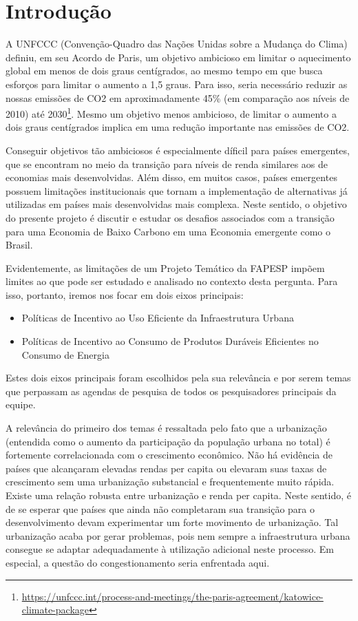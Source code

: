 \documentclass[
	12pt,				%
	openright,			%
	twoside,			%
	a4paper,			%
	english,			%
	french,				%
	spanish,			%
	brazil,				%
	]{abntex2}
\begin{document}
\chapter*[Introdução]{Introdução}


A UNFCCC (Convenção-Quadro das Nações Unidas sobre a Mudança do Clima) definiu, em seu Acordo de Paris, um objetivo ambicioso em limitar o aquecimento global em menos de dois graus centígrados, ao mesmo tempo em que busca esforços para limitar o aumento a 1,5 graus. Para isso, seria necessário reduzir as nossas emissões de CO2 em aproximadamente 45\% (em comparação aos níveis de 2010) até 2030\footnote{\url{https://unfccc.int/process-and-meetings/the-paris-agreement/katowice-climate-package}}. Mesmo um objetivo menos ambicioso, de limitar o aumento a dois graus centígrados implica em uma redução importante nas emissões de CO2. 

Conseguir objetivos tão ambiciosos é especialmente díficil para países emergentes, que se encontram no meio da transição para níveis de renda similares aos de economias mais desenvolvidas. Além disso, em muitos casos, países emergentes possuem limitações institucionais que tornam a implementação de alternativas já utilizadas em países mais desenvolvidas mais complexa. Neste sentido, o objetivo do presente projeto é discutir e estudar os desafios associados com a transição para uma Economia de Baixo Carbono em uma Economia emergente como o Brasil. 

Evidentemente, as limitações de um Projeto Temático da FAPESP impõem limites ao que pode ser estudado e analisado no contexto desta pergunta. Para isso, portanto, iremos nos focar em dois eixos principais:

\begin{itemize}
	\item Políticas de Incentivo ao Uso Eficiente da Infraestrutura Urbana
	\item Políticas de Incentivo ao Consumo de Produtos Duráveis Eficientes no Consumo de Energia
\end{itemize}

Estes dois eixos principais foram escolhidos pela sua relevância e por serem temas que perpassam as agendas de pesquisa de todos os pesquisadores principais da equipe. 

A relevância do primeiro dos temas é ressaltada pelo fato que a urbanização (entendida como o aumento da participação da população urbana no total) é fortemente correlacionada com o crescimento econômico. Não há evidência de países que alcançaram elevadas rendas per capita ou elevaram suas taxas de crescimento sem uma urbanização substancial e frequentemente muito rápida. Existe uma relação robusta entre urbanização e renda per capita. Neste sentido, é de se esperar que países que ainda não completaram sua transição para o desenvolvimento devam experimentar um forte movimento de urbanização. Tal urbanização acaba por gerar problemas, pois nem sempre a infraestrutura urbana consegue se adaptar adequadamente à utilização adicional neste processo. Em especial, a questão do congestionamento seria enfrentada aqui.
\end{document}
